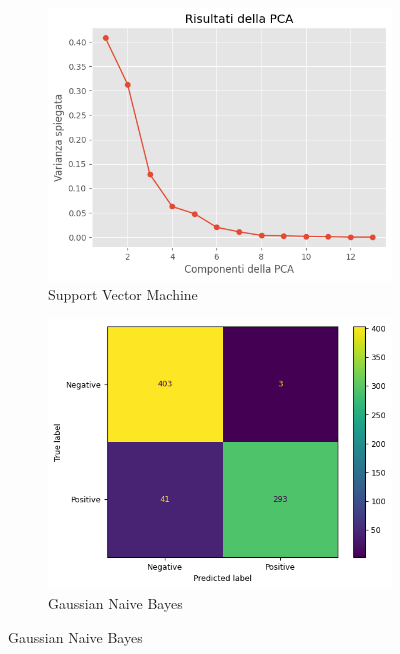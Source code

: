 \begin{figure}[!ht]
    \centering
    \begin{subfigure}{0.45\textwidth}
        \centering
        \includegraphics[width=\textwidth]{img/analisi/pcaVarianza.png}
        \caption{Support Vector Machine}
        \label{fig:matrice_di_confusione_per_SVM_corr}
    \end{subfigure}
    \hfill
    \begin{subfigure}{.45\textwidth}
        \centering
        \includegraphics[width=\textwidth]{img/gnb/confusion_matrix_corr.png}
        \caption{Gaussian Naive Bayes}
        \label{fig:matrice_di_confusione_per_GNB_corr}

\end{subfigure}
\end{figure}

